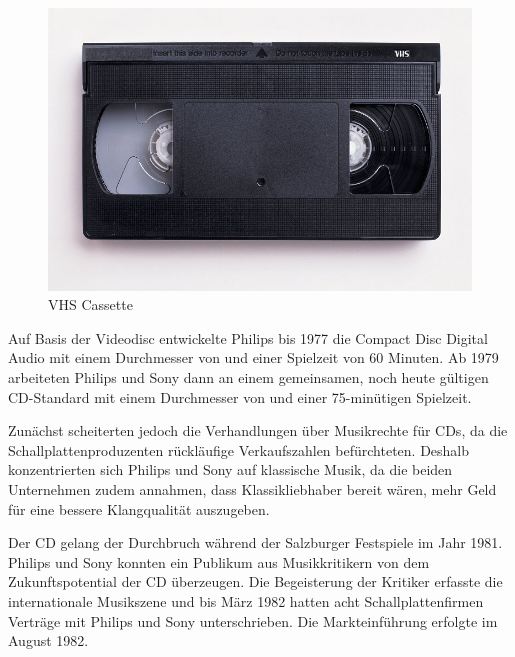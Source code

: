 {\begin{figure}[h]
\begin{center}
            \begin{minipage}[t]{0.4\textwidth}
                \begin{center}
                    \includegraphics[height=0.1\textheight]{Bilder/Optische_Datentraeger_Die_Compact_Disc/Geschichte/vhs.png}
                    \caption[VHS cassette \newline \url{https://upload.wikimedia.org/wikipedia/commons/6/67/VHS-cassette.jpg} (zuletzt aufgerufen am 19.09.2015)]{VHS Cassette}
                    \label{fig:vhs}
                \end{center}
            \end{minipage}
        \end{center}
    \end{figure}
}{}

Auf Basis der Videodisc entwickelte Philips bis 1977 die Compact Disc Digital
Audio mit einem Durchmesser von  und einer Spielzeit von 60
Minuten. Ab 1979 arbeiteten Philips und Sony dann an einem gemeinsamen, noch
heute gültigen CD-Standard mit einem Durchmesser von \nolbreaks{12 cm} und einer
75-minütigen Spielzeit. \cite{cds}

Zunächst scheiterten jedoch die Verhandlungen über Musikrechte für CDs, da die
Schallplattenproduzenten rückläufige Verkaufszahlen befürchteten. Deshalb
konzentrierten sich Philips und Sony auf klassische Musik, da die beiden
Unternehmen zudem annahmen, dass Klassikliebhaber bereit wären, mehr Geld für
eine bessere Klangqualität auszugeben.

Der CD gelang der Durchbruch während der Salzburger Festspiele im Jahr 1981.
Philips und Sony konnten ein Publikum aus Musikkritikern von dem
Zukunftspotential der CD überzeugen. Die Begeisterung der Kritiker erfasste die
internationale Musikszene und bis März 1982 hatten acht Schallplattenfirmen
Verträge mit Philips und Sony unterschrieben. Die Markteinführung erfolgte im
August 1982. \cite{cuz}

